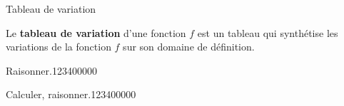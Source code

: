 \begin{pageCours}
\begin{DefT}{Tableau de variation}
\begin{minipage}{0.45\linewidth}
Le \textbf{tableau de variation} d'une fonction $f$ est un tableau qui synthétise les variations de la fonction $f$ sur son domaine de définition.

\end{minipage}
\hfill
\begin{minipage}{0.53\linewidth}


\end{minipage}  
\end{DefT}


\end{pageCours} %


\begin{pageAD}  %
\restoregeometry %


 
 
 
 
 
\begin{ExoCad}{Raisonner.}{1234}{0}{0}{0}{0}{0}



\end{ExoCad} 

\begin{ExoCad}{Calculer, raisonner.}{1234}{0}{0}{0}{0}{0}


\end{ExoCad}
 
\end{pageAD} %

